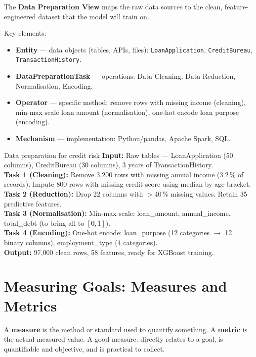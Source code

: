 \documentclass[a4paper,11pt]{article}
\newcommand{\vocab}[1]{\textbf{\color{navy}#1}}
\begin{document}
The \vocab{Data Preparation View} maps the raw data sources to the clean, feature-engineered dataset that the model will train on.

Key elements:
\begin{itemize}
  \item \vocab{Entity} --- data objects (tables, APIs, files): \texttt{LoanApplication}, \texttt{CreditBureau}, \texttt{TransactionHistory}.
  \item \vocab{DataPreparationTask} --- operations: Data Cleaning, Data Reduction, Normalisation, Encoding.
  \item \vocab{Operator} --- specific method: remove rows with missing income (cleaning), min-max scale loan amount (normalisation), one-hot encode loan purpose (encoding).
  \item \vocab{Mechanism} --- implementation: Python/pandas, Apache Spark, SQL.
\end{itemize}

\begin{worked}{Data preparation for credit risk}
\textbf{Input:} Raw tables --- LoanApplication (50 columns), CreditBureau (30 columns), 3 years of TransactionHistory. \\[4pt]
\textbf{Task 1 (Cleaning):} Remove 3{,}200 rows with missing annual income (3.2\,\% of records). Impute 800 rows with missing credit score using median by age bracket. \\
\textbf{Task 2 (Reduction):} Drop 22 columns with $>$40\,\% missing values. Retain 35 predictive features. \\
\textbf{Task 3 (Normalisation):} Min-max scale: loan\_amount, annual\_income, total\_debt (to bring all to $[0,1]$). \\
\textbf{Task 4 (Encoding):} One-hot encode: loan\_purpose (12 categories $\rightarrow$ 12 binary columns), employment\_type (4 categories). \\
\textbf{Output:} 97{,}000 clean rows, 58 features, ready for XGBoost training.
\end{worked}

\section{Measuring Goals: Measures and Metrics}

A \vocab{measure} is the method or standard used to quantify something. A \vocab{metric} is the actual measured value. A good measure: directly relates to a goal, is quantifiable and objective, and is practical to collect.
\end{document}
